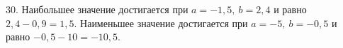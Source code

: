 30. Наибольшее значение достигается при $a=-1,5,\ b=2,4$ и равно $2,4-0,9=1,5.$ Наименьшее значение достигается при $a=-5,\ b=-0,5$ и равно $-0,5-10=-10,5.$\\
